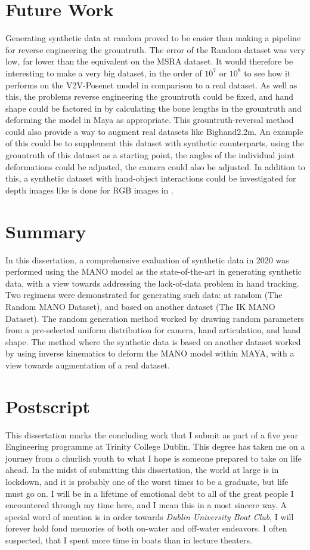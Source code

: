 \section{Future Work}
\label{sec:conc:fw}
Generating synthetic data at random proved to be easier than making a pipeline for reverse engineering the grountruth. The error of the Random dataset was very low, far lower than the equivalent on the MSRA dataset. It would therefore be interesting to make a very big dataset, in the order of $10^7$ or $10^8$ to see how it performs on the V2V-Posenet model in comparison to a real dataset. As well as this, the problems reverse engineering the grountruth could be fixed, and hand shape could be factored in by calculating the bone lengths in the grountruth and deforming the model in Maya as appropriate. This grountruth-reversal method could also provide a way to augment real datasets like Bighand2.2m. An example of this could be to supplement this dataset with synthetic counterparts, using the grountruth of this dataset as a starting point, the angles of the individual joint deformations could be adjusted, the camera could also be adjusted. In addition to this, a synthetic dataset with hand-object interactions could be investigated for depth images like is done for RGB images in \cite{mueller2017real}.

\section{Summary}
\label{sec:conc:ref}
In this dissertation, a comprehensive evaluation of synthetic data in 2020 was performed using the MANO model as the state-of-the-art in generating synthetic data, with a view towards addressing the lack-of-data problem in hand tracking. Two regimens were demonstrated for generating such data: at random (The Random MANO Dataset), and based on another dataset (The IK MANO Dataset). The random generation method worked by drawing random parameters from a pre-selected uniform distribution for camera, hand articulation, and hand shape. The method where the synthetic data is based on another dataset worked by using inverse kinematics to deform the MANO model within MAYA, with a view towards augmentation of a real dataset.

\section{Postscript}
\label{sec:conc:ps}
This dissertation marks the concluding work that I submit as part of a five year Engineering programme at Trinity College Dublin. This degree has taken me on a journey from a churlish youth to what I hope is someone prepared to take on life ahead. In the midst of submitting this dissertation, the world at large is in lockdown, and it is probably one of the worst times to be a graduate, but life must go on. I will be in a lifetime of emotional debt to all of the great people I encountered through my time here, and I mean this in a most sincere way. A special word of mention is in order towards {\slshape Dublin University Boat Club}, I will forever hold fond memories of both on-water and off-water endeavors. I often suspected, that I spent more time in boats than in lecture theaters.